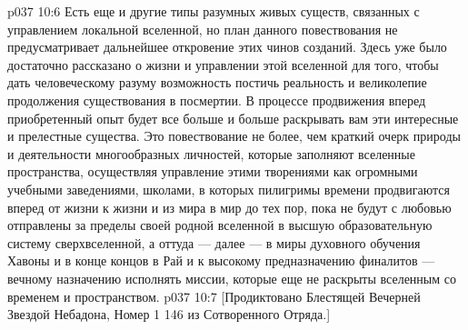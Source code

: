 \vs p037 10:6 Есть еще и другие типы разумных живых существ, связанных с управлением локальной вселенной, но план данного повествования не предусматривает дальнейшее откровение этих чинов созданий. Здесь уже было достаточно рассказано о жизни и управлении этой вселенной для того, чтобы дать человеческому разуму возможность постичь реальность и великолепие продолжения существования в посмертии. В процессе продвижения вперед приобретенный опыт будет все больше и больше раскрывать вам эти интересные и прелестные существа. Это повествование не более, чем краткий очерк природы и деятельности многообразных личностей, которые заполняют вселенные пространства, осуществляя управление этими творениями как огромными учебными заведениями, школами, в которых пилигримы времени продвигаются вперед от жизни к жизни и из мира в мир до тех пор, пока не будут с любовью отправлены за пределы своей родной вселенной в высшую образовательную систему сверхвселенной, а оттуда --- далее --- в миры духовного обучения Хавоны и в конце концов в Рай и к высокому предназначению финалитов --- вечному назначению исполнять миссии, которые еще не раскрыты вселенным со временем и пространством.
\vsetoff
\vs p037 10:7 [Продиктовано Блестящей Вечерней Звездой Небадона, Номер 1 146 из Сотворенного Отряда.]

